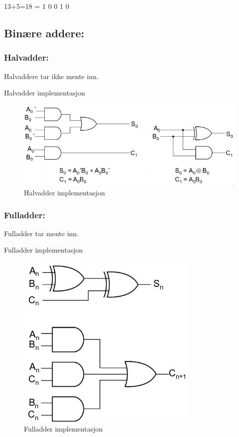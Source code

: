 \documentclass{article}
\begin{document}
	13+5=18 = 1 0 0 1 0
	
	\subsection{Binære addere:}
	\subsubsection{Halvadder:}
	Halvaddere tar ikke mente inn.
	
	Halvadder implementasjon
	\begin{figure}[H]
		\includegraphics[scale = 0.7]{halvadd.jpg}
		\caption{Halvadder implementasjon}
	\end{figure}
	
	\subsubsection{Fulladder:}
	Fulladder tar mente inn.
	
	Fulladder implementasjon
	\begin{figure}[H]
		\includegraphics[scale = 0.7]{Fulladd.jpg}
		\caption{Fulladder implementasjon}
	\end{figure}
	
\end{document}

